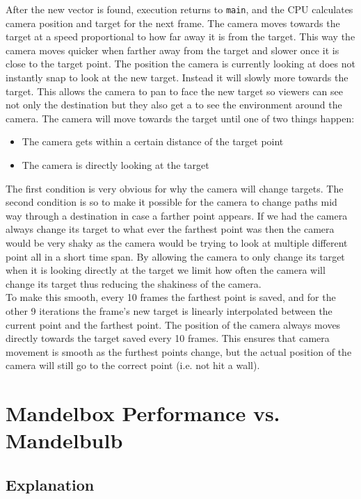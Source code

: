 \documentclass[11pt]{article}
\begin{document}
After the new vector is found, execution returns to \texttt{main}, and the CPU calculates camera position and target for the next frame. The camera moves towards the target at a speed proportional to how far away it is from the target. This way the camera moves quicker when farther away from the target and slower once it is close to the target point. The position the camera is currently looking at does not instantly snap to look at the new target. Instead it will slowly more towards the target. This allows the camera to pan to face the new target so viewers can see not only the destination but they also get a to see the environment around the camera. The camera will move towards the target until one of two things happen:
\begin{itemize}
\item The camera gets within a certain distance of the target point
\item The camera is directly looking at the target
\end{itemize}
The first condition is very obvious for why the camera will change targets. The second condition is so to make it possible for the camera to change paths mid way through a destination in case a farther point appears. If we had the camera always change its target to what ever the farthest point was then the camera would be very shaky as the camera would be trying to look at multiple different point all in a short time span. By allowing the camera to only change its target when it is looking directly at the target we limit how often the camera will change its target thus reducing the shakiness of the camera.\\


To make this smooth, every 10 frames the farthest point is saved, and for the other 9 iterations the frame's new target is linearly interpolated between the current point and the farthest point. The position of the camera always moves directly towards the target saved every 10 frames. This ensures that camera movement is smooth as the furthest points change, but the actual position of the camera will still go to the correct point (i.e. not hit a wall).

\section{Mandelbox Performance vs. Mandelbulb}
\subsection{Explanation}
\end{document}
